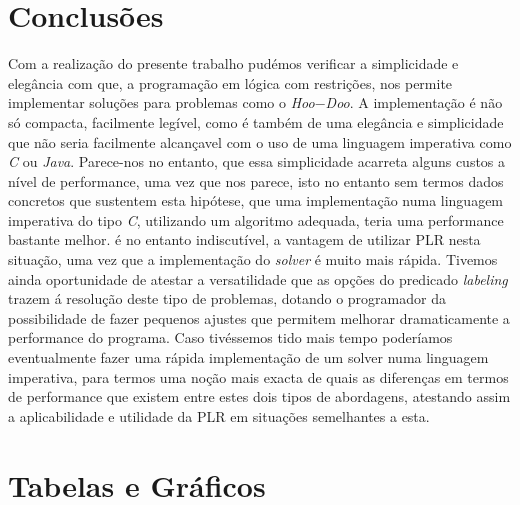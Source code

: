 \documentclass{llncs}
\begin{document}
\section{Conclus\~{o}es}

Com a realiza\c{c}\~{a}o do presente trabalho pud\'{e}mos verificar a simplicidade e elegância com que, a programa\c{c}\~{a}o em l\'{o}gica com restri\c{c}\~{o}es, nos permite implementar solu\c{c}\~{o}es para problemas como o \emph{Hoo$-$Doo}.
A implementa\c{c}\~{a}o \'{e} n\~{a}o s\'{o} compacta, facilmente leg\'{i}vel, como \'{e} tamb\'{e}m de uma elegância e simplicidade que n\~{a}o seria facilmente alcan\c{c}avel com o uso de uma linguagem imperativa como \emph{C} ou \emph{Java}.
Parece-nos no entanto, que essa simplicidade acarreta alguns custos a n\'{i}vel de performance, uma vez que nos parece, isto no entanto sem termos dados concretos que sustentem esta hip\'{o}tese, que uma implementa\c{c}\~{a}o numa linguagem imperativa do tipo \emph{C}, utilizando um algoritmo adequada, teria uma performance bastante melhor.
\'{e} no entanto indiscut\'{i}vel, a vantagem de utilizar PLR nesta situa\c{c}\~{a}o, uma vez que a implementa\c{c}\~{a}o do \emph{solver} \'{e} muito mais r\'{a}pida.
Tivemos ainda oportunidade de atestar a versatilidade que as op\c{c}\~{o}es do predicado \emph{labeling} trazem \'{a} resolu\c{c}\~{a}o deste tipo de problemas, dotando o programador da possibilidade de fazer pequenos ajustes que permitem melhorar dramaticamente a performance do programa.
Caso tiv\'{e}ssemos tido mais tempo poder\'{i}amos eventualmente fazer uma r\'{a}pida implementa\c{c}\~{a}o de um solver numa linguagem imperativa, para termos uma no\c{c}\~{a}o mais exacta de quais as diferen\c{c}as em termos de performance que existem entre estes dois tipos de abordagens, atestando assim a aplicabilidade e utilidade da PLR em situa\c{c}\~{o}es semelhantes a esta.
\nocite{sicstusManual}
\nocite{hooDoo}



\clearpage
{}
\renewcommand\refname{Bibliografia}




\newpage
\appendix



\section{Tabelas e Gr\'{a}ficos}
\end{document}
